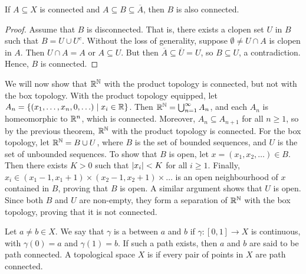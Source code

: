 \begin{theorem}
    If $A \subseteq X$ is connected and $A \subseteq B \subseteq \overline{A}$, then $B$ is also connected.
\end{theorem}
\begin{proof}
    Assume that $B$ is disconnected. That is, there exists a clopen set $U$ in $B$ such that $B = U \cup U^{c}$. Without the loss of generality, suppose $\emptyset \neq U \cap A$ is clopen in $A$. Then $U \cap A = A$ or $A \subseteq U$. But then $\overline{A} \subseteq \overline{U} = U$, so $B \subseteq U$, a contradiction. Hence, $B$ is connected.
\end{proof}

We will now show that $\mathbb{R}^{\mathbb{N}}$ with the product topology is connected, but not with the box topology. With the product topology equipped, let $A_{n} = \{(x_{1},\ldots,x_{n},0,\ldots) \mid x_{i} \in \mathbb{R}\}$. Then $\mathbb{R}^{\mathbb{N}} = \bigcup_{n=1}^{\infty} A_{n}$, and each $A_{n}$ is homeomorphic to $\mathbb{R}^{n}$, which is connected. Moreover, $A_{n} \subseteq A_{n+1}$ for all $n \geq 1$, so by the previous theorem, $\mathbb{R}^{\mathbb{N}}$ with the product topology is connected. For the box topology, let $\mathbb{R}^{\mathbb{N}} = B \cup U$, where $B$ is the set of bounded sequences, and $U$ is the set of unbounded sequences. To show that $B$ is open, let $x = (x_{1}, x_{2}, \ldots) \in B$. Then there exists $K > 0$ such that $\left| x_{i} \right| < K$ for all $i \geq 1$. Finally, $x_{i} \in (x_{1}-1, x_{1}+1) \times (x_{2}-1, x_{2}+1) \times \ldots$ is an open neighbourhood of $x$ contained in $B$, proving that $B$ is open. A similar argument shows that $U$ is open. Since both $B$ and $U$ are non-empty, they form a separation of $\mathbb{R}^{\mathbb{N}}$ with the box topology, proving that it is not connected.

\begin{definition}
    Let $a \neq b \in X$. We say that $\gamma$ is a  between $a$ and $b$ if $\gamma : [0,1] \to X$ is continuous, with $\gamma(0) = a$ and $\gamma(1) = b$. If such a path exists, then $a$ and $b$ are said to be path connected. A topological space $X$ is  if every pair of points in $X$ are path connected.
\end{definition}

